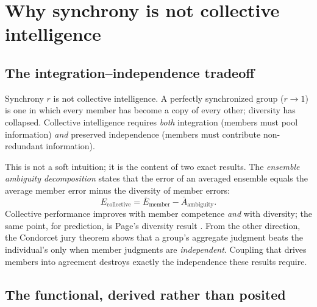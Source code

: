 \documentclass[11pt]{article}
\begin{document}
\section{Why synchrony is not collective intelligence}

\subsection{The integration--independence tradeoff}

Synchrony $r$ is not collective intelligence. A perfectly synchronized group ($r \to 1$) is one in which every member has become a copy of every other; diversity has collapsed. Collective intelligence requires \emph{both} integration (members must pool information) \emph{and} preserved independence (members must contribute non-redundant information).

This is not a soft intuition; it is the content of two exact results. The \emph{ensemble ambiguity decomposition} \citep{krogh1995neural} states that the error of an averaged ensemble equals the average member error minus the diversity of member errors:
\begin{equation}
E_{\text{collective}} = \bar{E}_{\text{member}} - \bar{A}_{\text{ambiguity}}.
\label{eq:ambiguity}
\end{equation}
Collective performance improves with member competence \emph{and} with diversity; the same point, for prediction, is Page's diversity result \citep{hong2004groups}. From the other direction, the Condorcet jury theorem \citep{condorcet1785essai} shows that a group's aggregate judgment beats the individual's only when member judgments are \emph{independent}. Coupling that drives members into agreement destroys exactly the independence these results require.

\subsection{The functional, derived rather than posited}
\end{document}
